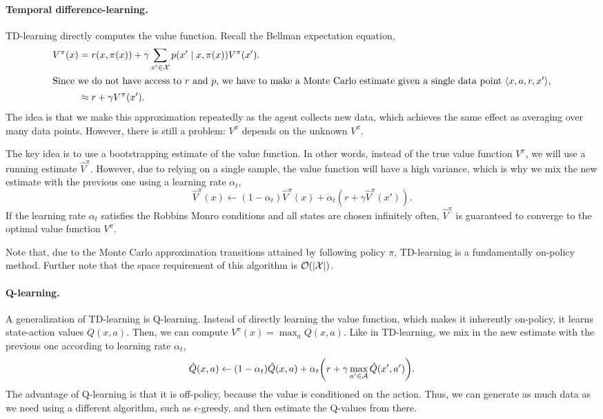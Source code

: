 \paragraph{Temporal difference-learning.}

TD-learning directly computes the value function. Recall the Bellman
expectation equation, 
\begin{align*}
  V^\pi(x) &= r(x,\pi(x)) + \gamma \sum_{x'\in\mathcal{X}} p(x'\mid x,\pi(x)) V^\pi(x'). \\
  \intertext{Since we do not have access to $r$ and $p$, we have to make a
  Monte Carlo estimate given a single data point $\langle x,a,r,x' \rangle$,}
  &\approx r + \gamma V^\pi(x').
\end{align*}
The idea is that we make this approximation repeatedly as the agent collects
new data, which achieves the same effect as averaging over many data points.
However, there is still a problem: $V^\pi$ depends on the unknown $V^\pi$.

The key idea is to use a bootstrapping estimate of the value function. In other
words, instead of the true value function $V^\pi$, we will use a running
estimate $\hat{V}^\pi$. However, due to relying on a single sample, the value
function will have a high variance, which is why we mix the new estimate with
the previous one using a learning rate $\alpha_t$, \[
  \hat{V}^\pi(x) \gets (1-\alpha_t) \hat{V}^\pi(x) + \alpha_t(r + \gamma \hat{V}^\pi(x')).
\]
If the learning rate $\alpha_t$ satisfies the Robbins Monro conditions and all
states are chosen infinitely often, $\hat{V}^\pi$ is guaranteed to converge to
the optimal value function $V^\pi$.

Note that, due to the Monte Carlo approximation \wrt transitions attained by
following policy $\pi$, TD-learning is a fundamentally on-policy method.
Further note that the space requirement of this algorithm is $\bigo{|\X|}$.

\paragraph{Q-learning.}

A generalization of TD-learning is Q-learning. Instead of directly learning the
value function, which makes it inherently on-policy, it learns state-action
values $Q(x,a)$. Then, we can compute $V^\pi(x) = \max_{a} Q(x,a)$. Like in
TD-learning, we mix in the new estimate with the previous one according to
learning rate $\alpha_t$, \[
  \hat{Q}(x,a) \gets (1-\alpha_t) \hat{Q}(x,a) + \alpha_t \lft( r + \gamma \max_{a'\in\mathcal{A}} \hat{Q}(x',a') \rgt).
\]
The advantage of Q-learning is that it is off-policy, because the value is
conditioned on the action. Thus, we can generate as much data as we need using a
different algorithm, such as $\epsilon$-greedy, and then estimate the Q-values
from there.

